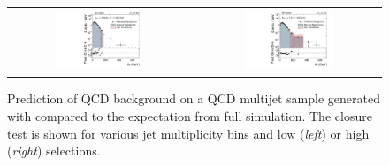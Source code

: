 \begin{figure}[!hp]
\begin{tabular}{cc}
                \includegraphics[width=0.49\textwidth]{figures/MHT_JetBin4_HTlow_madgraph_DR53X_chs_TuneZ2star_pt10_withoutPUReweighting_UseRebCorrection_v1.pdf} &
                \includegraphics[width=0.49\textwidth]{figures/MHT_JetBin4_HThigh_madgraph_DR53X_chs_TuneZ2star_pt10_withoutPUReweighting_UseRebCorrection_v1.pdf}\\

  \end{tabular}
  \caption{Prediction of QCD background on a QCD multijet sample generated with \madgraph compared to the expectation from full simulation. The closure test is shown for various jet multiplicity bins and low (\textit{left}) or high (\textit{right}) \HT selections.}
  \label{fig:qcd_rs_closure}
\end{figure}
